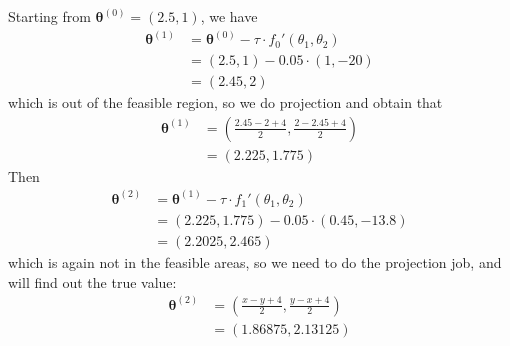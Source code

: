 \documentclass{article}
\begin{document}
Starting from $\bm{\theta}^{(0)}=(2.5, 1)$, we have
\begin{equation}
	\begin{aligned}
		\bm{\theta}^{(1)}
		&= \bm{\theta}^{(0)} - \tau \cdot f_0'(\theta_1, \theta_2)\\
		&= (2.5, 1) - 0.05 \cdot (1, -20)\\
		&= (2.45, 2)
	\end{aligned}	
\end{equation}
which is out of the feasible region, so we do projection and obtain that
\begin{equation}
	\begin{aligned}
		\bm{\theta}^{(1)}
		&= (\frac{2.45-2+4}{2},\frac{2-2.45+4}{2})\\
		&= (2.225, 1.775)
	\end{aligned}
\end{equation}
Then
\begin{equation}
	\begin{aligned}
		\bm{\theta}^{(2)}
		&= \bm{\theta}^{(1)} - \tau \cdot f_1'(\theta_1, \theta_2)\\
		&= (2.225, 1.775) - 0.05 \cdot (0.45, -13.8)\\
		&= (2.2025, 2.465)
	\end{aligned}	
\end{equation}
which is again not in the feasible areas, so we need to do the projection job, and will find out the true value:
\begin{equation}
	\begin{aligned}
		\bm{\theta}^{(2)}
		&= (\frac{x-y+4}{2},\frac{y-x+4}{2})\\
		&= (1.86875, 2.13125)
	\end{aligned}
\end{equation}
\end{document}
